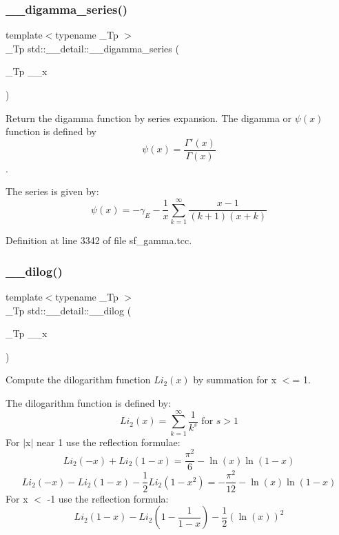 \subsubsection{\texorpdfstring{\+\_\+\+\_\+digamma\+\_\+series()}{\_\_digamma\_series()}}
{\footnotesize\ttfamily template$<$typename \+\_\+\+Tp $>$ \\
\+\_\+\+Tp std\+::\+\_\+\+\_\+detail\+::\+\_\+\+\_\+digamma\+\_\+series (\begin{DoxyParamCaption}\item[{\+\_\+\+Tp}]{\+\_\+\+\_\+x }\end{DoxyParamCaption})}



Return the digamma function by series expansion. The digamma or $ \psi(x) $ function is defined by \[ \psi(x) = \frac{\Gamma'(x)}{\Gamma(x)} \]. 

The series is given by\+: \[ \psi(x) = -\gamma_E - \frac{1}{x} \sum_{k=1}^{\infty} \frac{x - 1}{(k + 1)(x + k)} \] 

Definition at line 3342 of file sf\+\_\+gamma.\+tcc.

\mbox{\label{namespacestd_1_1____detail_a5083a0c9fce3299593ca22e7dbaeaf19}} 
\subsubsection{\texorpdfstring{\+\_\+\+\_\+dilog()}{\_\_dilog()}}
{\footnotesize\ttfamily template$<$typename \+\_\+\+Tp $>$ \\
\+\_\+\+Tp std\+::\+\_\+\+\_\+detail\+::\+\_\+\+\_\+dilog (\begin{DoxyParamCaption}\item[{\+\_\+\+Tp}]{\+\_\+\+\_\+x }\end{DoxyParamCaption})}



Compute the dilogarithm function $ Li_2(x) $ by summation for x $<$= 1. 

The dilogarithm function is defined by\+: \[ Li_2(x) = \sum_{k=1}^{\infty} \frac{1}{k^{s}} \mbox{ for } s > 1 \] For $\vert$x$\vert$ near 1 use the reflection formulae\+: \[ Li_2(-x) + Li_2(1-x) = \frac{\pi^2}{6} - \ln(x) \ln(1-x) \] \[ Li_2(-x) - Li_2(1-x) - \frac{1}{2}Li_2(1-x^2) = -\frac{\pi^2}{12} - \ln(x) \ln(1-x) \] For x $<$ -\/1 use the reflection formula\+: \[ Li_2(1-x) - Li_2(1-\frac{1}{1-x}) - \frac{1}{2}(\ln(x))^2 \] 

